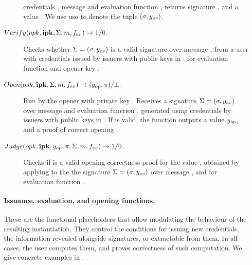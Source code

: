 \begin{description}
  credentials \sCred, message \msg and evaluation function \feval, returns
  signature \sig, and a value \yeval. We use use \Sig to denote the
  tuple $(\sigma,y_{ev})$.
\item[$Verify(opk,\mathbf{ipk},\Sigma,m,f_{ev}) \rightarrow 1/0$.]
  Checks whether $\Sigma = (\sigma,y_{ev})$ is a valid signature
  over message \msg, from a user with credentials issued by issuers with public
  keys in \sipk, for evaluation function \feval and opener key \opk.
\item[$Open(osk,\mathbf{ipk},\Sigma,m,f_{ev}) \rightarrow
  (y_{op},\pi)/\bot$.]
  Run by the opener with private key \osk. Receives a signature $\Sigma=
  (\sigma,y_{ev})$ over message \msg and evaluation function \feval,
  generated using credentials by issuers with public keys in \sipk.
  If \Sig is valid, the function outputs a value $y_{op}$, and a proof of
  correct opening \iproof.
\item[$Judge(opk,\mathbf{ipk},y_{op},\pi,\Sigma,m,f_{ev}) \rightarrow 1/0$.] %
  Checks if \iproof is a valid opening correctness proof for the value \yinsp,
  obtained by applying \Open to the the signature $\Sigma = (\sigma,y_{ev})$
  over message \msg, and for evaluation function \feval. 
\end{description}

\paragraph{Issuance, evaluation, and opening functions.} %
These are the functional placeholders that allow modulating the behaviour of the
resulting instantiation. They control the conditions for issuing new
credentials, the information revealed alongside signatures, or extractable
from them. In all cases, the user computes them, and proves correctness of
such computation. We give concrete examples in .

